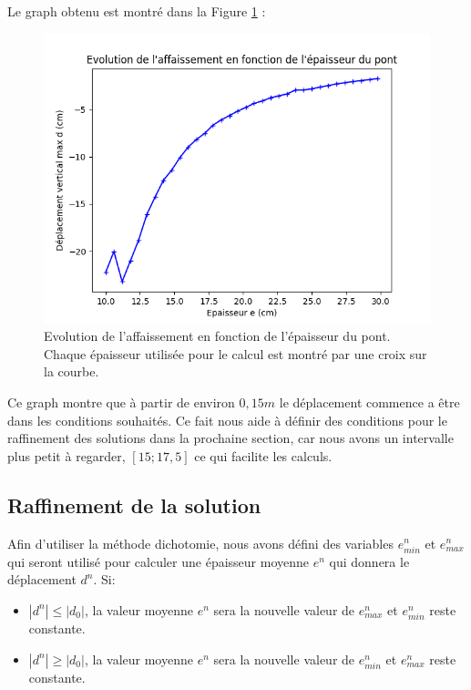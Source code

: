 \documentclass{article}
\begin{document}
    Le graph obtenu est montré dans la Figure \ref{fig:graph} :
    \begin{figure}[H]        
    \begin{center}
	
        \includegraphics[width=12cm]{imgs/graph.png}
        \caption{Evolution de l'affaissement en fonction de l'épaisseur du pont. Chaque épaisseur utilisée pour le calcul est montré par une croix sur la courbe.}
        \label{fig:graph}
    
	\end{center}
    \end{figure}
    Ce graph montre que à partir de environ $0,15 m$ le déplacement commence a être dans les conditions souhaités. Ce fait nous aide à définir des conditions pour le raffinement des solutions dans la prochaine section, car nous avons un intervalle plus petit à regarder, $[15; 17,5]$ ce qui facilite les calculs.
    \subsection{Raffinement de la solution}
    
    Afin d'utiliser la méthode dichotomie, nous avons défini des variables $e^n_{min}$ et $e^n_{max}$  qui seront utilisé pour calculer une épaisseur moyenne $e^n$ 	qui donnera le déplacement $d^n$. Si:
    
    \begin{itemize}
    \item $|d^n| \le |d_0|$, la valeur moyenne $e^n$ sera la nouvelle valeur de $e^n_{max}$ et $e^n_{min}$ reste constante.
    \item $|d^n| \ge |d_0|$, la valeur moyenne $e^n$ sera la nouvelle valeur de $e^n_{min}$ et $e^n_{max}$ reste constante.
    \end{itemize}
   
\end{document}
